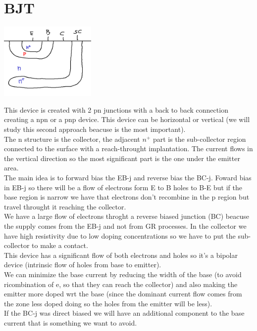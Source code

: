 \chapter{BJT}


\centering
\includegraphics[width=0.35\textwidth]{bjt1.png}\\
\raggedright

This device is created with 2 pn junctions with a back to back connection creating a npn or a pnp device. This device can be horizontal or vertical (we will study this second approach beacuse is the most important).\\
The n structure is the collector, the adjacent $n^+$ part is the sub-collector region connected to the surface with a reach-throught implantation. The current flows in the vertical direction so the most significant part is the one under the emitter area.\\
The main idea is to forward bias the EB-j and reverse bias the BC-j. Foward bias in EB-j so there will be a flow of electrons form E to B holes to B-E but if the base region is narrow we have that electrons don't recombine in the p region but travel throught it reaching the collector.\\
We have a large flow of electrons throght a reverse biased junction (BC) beacuse the supply comes from the EB-j and not from GR processes. In the collector we have high resistivity due to low doping concentrations so we have to put the sub-collector to make a contact.\\
\vspace{5mm}
This device has a significant flow of both electrons and holes so it's a bipolar device (intrinsic flow of holes from base to emitter).\\
We can minimize the base current by reducing the width of the base (to avoid ricombination of e, so that they can reach the collector) and also making the emitter more doped wrt the base (since the dominant current flow comes from the zone less doped doing so the holes from the emitter will be less).\\
\vspace{5mm}
If the BC-j was direct biased we will have an additional component to the base current that is something we want to avoid.\\


